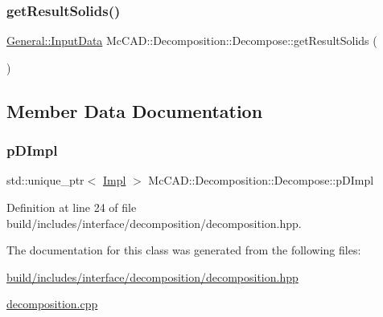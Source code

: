 \subsubsection{\texorpdfstring{get\+Result\+Solids()}{getResultSolids()}\hspace{0.1cm}{\footnotesize\ttfamily [2/2]}}
{\footnotesize\ttfamily \hyperlink{classMcCAD_1_1General_1_1InputData}{General\+::\+Input\+Data} Mc\+C\+A\+D\+::\+Decomposition\+::\+Decompose\+::get\+Result\+Solids (\begin{DoxyParamCaption}{ }\end{DoxyParamCaption})}



\subsection{Member Data Documentation}
\mbox{\label{classMcCAD_1_1Decomposition_1_1Decompose_aa39ced95c033a2a77e4fe2c60ad8427c}} 
\subsubsection{\texorpdfstring{p\+D\+Impl}{pDImpl}}
{\footnotesize\ttfamily std\+::unique\+\_\+ptr$<$ \hyperlink{classMcCAD_1_1Decomposition_1_1Decompose_1_1Impl}{Impl} $>$ Mc\+C\+A\+D\+::\+Decomposition\+::\+Decompose\+::p\+D\+Impl\hspace{0.3cm}{\ttfamily [private]}}



Definition at line 24 of file build/includes/interface/decomposition/decomposition.\+hpp.



The documentation for this class was generated from the following files\+:\begin{DoxyCompactItemize}
\item 
\hyperlink{build_2includes_2interface_2decomposition_2decomposition_8hpp}{build/includes/interface/decomposition/decomposition.\+hpp}\item 
\hyperlink{decomposition_8cpp}{decomposition.\+cpp}\end{DoxyCompactItemize}
